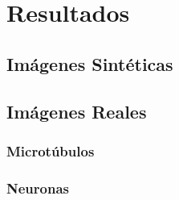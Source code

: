 \chapter{Resultados}
\label{chap:res}

\section{Im\'agenes Sint\'eticas}

\section{Im\'agenes Reales}

\subsection{Microt\'ubulos}

\subsection{Neuronas}